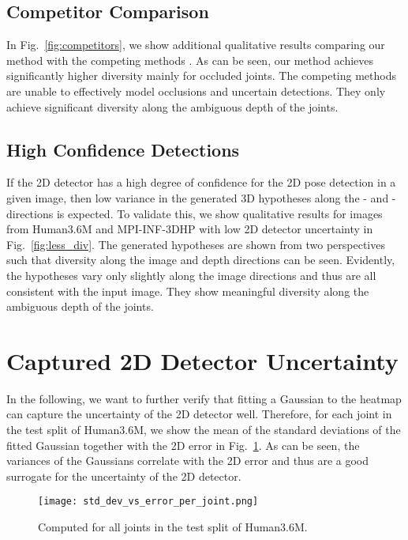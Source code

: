 \documentclass[10pt,twocolumn,letterpaper]{article}
\begin{document}
\subsection{Competitor Comparison}
In Fig.~\ref{fig:competitors}, we show additional qualitative results comparing our method with the competing methods \cite{Li_2019_CVPR,Sharma_2019_ICCV}.
As can be seen, our method achieves significantly higher diversity mainly for occluded joints.
The competing methods are unable to effectively model occlusions and uncertain detections.
They only achieve significant diversity along the ambiguous depth of the joints.


\subsection{High Confidence Detections}
If the 2D detector has a high degree of confidence for the 2D pose detection in a given image, then low variance in the generated 3D hypotheses along the - and - directions is expected.
To validate this, we show qualitative results for images from Human3.6M and MPI-INF-3DHP with low 2D detector uncertainty in Fig.~\ref{fig:less_div}. 
The generated hypotheses are shown from two perspectives such that diversity along the image and depth directions can be seen.
Evidently, the hypotheses vary only slightly along the image directions and thus are all consistent with the input image.
They show meaningful diversity along the ambiguous depth of the joints.


\section{Captured 2D Detector Uncertainty}
In the following, we want to further verify that
fitting a Gaussian to the heatmap can capture the uncertainty of the 2D detector well.
Therefore, for each joint in the test split of Human3.6M, we show the mean of the standard deviations of the fitted Gaussian together with the 2D error in Fig.~\ref{fig:std_vs_error}.
As can be seen, the variances of the Gaussians correlate with the 2D error and thus are a good surrogate for the uncertainty of the 2D detector. 

\begin{figure}
\begin{center}
\texttt{[image: std\_dev\_vs\_error\_per\_joint.png]}
\caption{Computed for all joints in the test split of Human3.6M.}
\label{fig:std_vs_error}
\end{center}
\end{figure}
\end{document}
